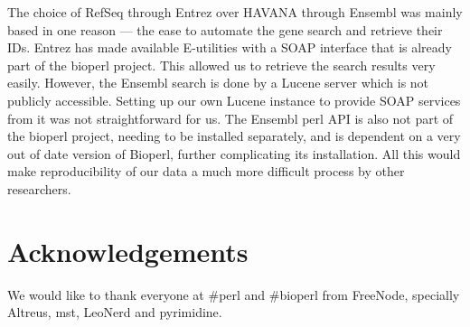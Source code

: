 \documentclass[10pt,a4paper,draft,article]{memoir}
\begin{document}
    The choice of RefSeq through Entrez over HAVANA through Ensembl was mainly based in one reason --- the ease
    to automate the gene search and retrieve their IDs. Entrez has made available E-utilities with a SOAP interface
    that is already part of the bioperl project. This allowed us to retrieve the search results very easily.
    However, the Ensembl search is done by a Lucene server which is not publicly accessible. Setting up our own
    Lucene instance to provide SOAP services from it was not straightforward for us. The Ensembl perl API is
    also not part of the bioperl project, needing to be installed separately, and is dependent on a very
    out of date version of Bioperl, further complicating its installation. All this would make reproducibility
    of our data a much more difficult process by other researchers.

  \section{Acknowledgements}
    We would like to thank everyone at \#perl and \#bioperl from FreeNode, specially Altreus, mst, LeoNerd and pyrimidine.

  
  
\end{document}

